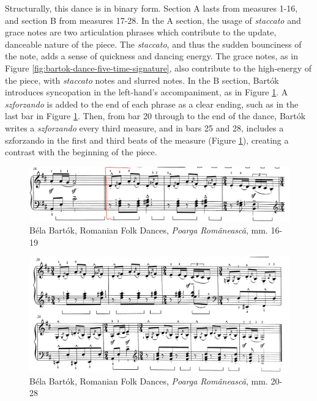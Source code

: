 Structurally, this dance is in binary form. Section A lasts from measures 1-16, and section B from measures 17-28. In the A section, the usage of \textit{staccato} and grace notes are two articulation phrases which contribute to the update, danceable nature of the piece. The \textit{staccato}, and thus the sudden bounciness of the note, adds a sense of quickness and dancing energy. The grace notes, as in Figure \ref{fig:bartok-dance-five-time-signature}\autocite{Lung_2016}, also contribute to the high-energy of the piece, with \textit{staccato} notes and slurred notes. In the B section, Bartók introduces syncopation in the left-hand's accompaniment, as in Figure \ref{fig:bartok-dance-five-b-section}\autocite{Lung_2016}. A \textit{szforzando} is added to the end of each phrase as a clear ending, such as in the last bar in Figure \ref{fig:bartok-dance-five-b-section}\autocite{Lung_2016}. Then, from bar 20 through to the end of the dance, Bartók writes a \textit{szforzando} every third measure, and in bars 25 and 28, includes a szforzando in the first and third beats of the measure (Figure \ref{fig:bartok-dance-five-b-section}\autocite{Lung_2016}), creating a contrast with the beginning of the piece. 

\begin{figure}
  \centering
  \includegraphics[width=\textwidth]{figures/bartok-dance-five-b-section.jpg}
  \caption{Béla Bartók, Romanian Folk Dances, \textit{Poarga Românească}, mm. 16-19}
  \label{fig:bartok-dance-five-b-section}
\end{figure}

\begin{figure}
  \centering
  \includegraphics[width=\textwidth]{figures/bartok-dance-five-ending.jpg}
  \caption{Béla Bartók, Romanian Folk Dances, \textit{Poarga Românească}, mm. 20-28}
  \label{fig:bartok-dance-five-ending}
\end{figure}


